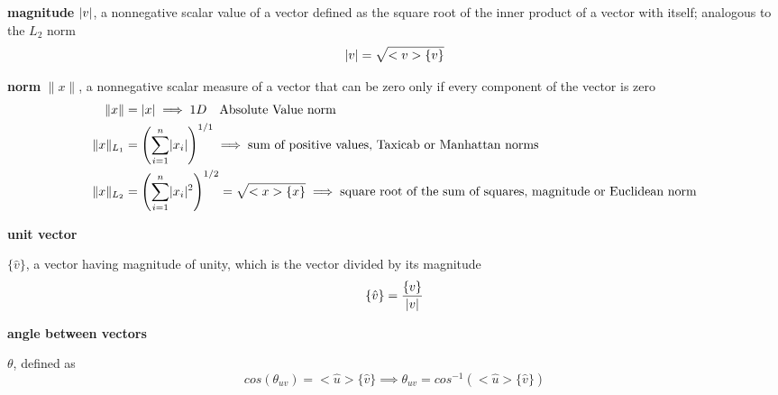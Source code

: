 \documentclass[letterpaper, 10pt, oneside]{article}
\newenvironment{dd}[1]{
	\noindent
	\textbf{\normalsize{#1}}
	\hspace{0.1in}
	\small
	\rmfamily
	}
	{\medskip}
\DeclarePairedDelimiter\abs{\lvert}{\rvert}%
\DeclarePairedDelimiter\norm{\lVert}{\rVert}%
\begin{document}
\begin{dd}{magnitude} $\abs{v}$, a nonnegative scalar value of a vector defined as the square root of the inner product of a vector with itself; analogous to the $L_2$ norm
$$\abs{v} = \sqrt{<v>\{v\}}$$
\end{dd}

\begin{dd}{norm} $\lVert x \rVert$,
a nonnegative scalar measure of a vector that can be zero only if every component of the vector is zero
	\begin{align*}
	\norm{x} &= \abs{x} \implies 1D\quad \text{Absolute Value norm}\\
	\norm{x}_{L_1} &= \left( \sum_{i=1}^{n} \abs{x_i} \right)^{1/1} \implies \text{sum of positive values, Taxicab or Manhattan norms}\\
	\norm{x}_{L_2} &= \left( \sum_{i=1}^{n} \abs{x_i}^2 \right)^{1/2}=\sqrt{<x> \{x\}} \implies \text{square root of the sum of squares, magnitude or Euclidean norm} \\
	\end{align*}
\end{dd}

\begin{dd}{unit vector}
$\{\hat{v}\}$, a vector having magnitude of unity, which is the vector divided by its magnitude
$$ \{\hat{v}\} = \frac{\{v\}}{\abs{v}}$$
\end{dd}

\begin{dd}{angle between vectors}
$\theta$, defined as
$$cos(\theta_{uv})=<\hat{u}>\{\hat{v}\} \implies \theta_{uv}=cos^{-1}(<\hat{u}>\{\hat{v}\})$$
\end{dd}
\end{document}
